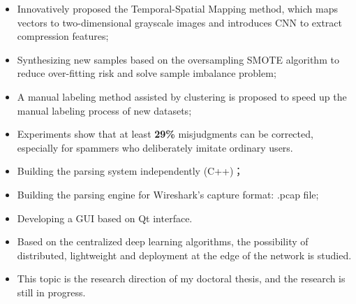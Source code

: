\documentclass{resume}
\begin{document}
\begin{itemize}
  \item Innovatively proposed the Temporal-Spatial Mapping method, which maps vectors to two-dimensional grayscale images and introduces CNN to extract compression features;
  \item Synthesizing new samples based on the oversampling SMOTE algorithm to reduce over-fitting risk and solve sample imbalance problem;
  \item A manual labeling method assisted by clustering is proposed to speed up the manual labeling process of new datasets;
  \item Experiments show that at least \textbf{29\%} misjudgments can be corrected, especially for spammers who deliberately imitate ordinary users.
\end{itemize}


\begin{itemize}
  \item Building the parsing system independently (C++)；
  \item Building the parsing engine for Wireshark's capture format: .pcap file;
  \item Developing a GUI based on Qt interface.
\end{itemize}

\begin{itemize}
  \item Based on the centralized deep learning algorithms, the possibility of distributed, lightweight and deployment at the edge of the network is studied.
  \item This topic is the research direction of my doctoral thesis, and the research is still in progress.
\end{itemize}
\end{document}
